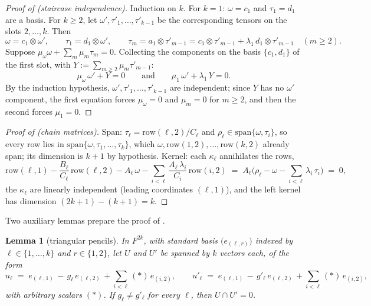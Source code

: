 \documentclass{article}
\newtheorem{lemma}[theorem]{Lemma}
\theoremstyle{definition}
\begin{document}
\begin{proof}[Proof of  (staircase independence)]
Induction on $k$. For $k = 1$: $\omega = c_1$ and $\tau_1 = d_1$ are a basis. For $k \geq 2$, let $\omega', \tau'_1, \dots, \tau'_{k-1}$ be the corresponding tensors on the slots $2, \dots, k$. Then
\[
\omega = c_1 \otimes \omega', \qquad \tau_1 = d_1 \otimes \omega', \qquad \tau_m = a_1 \otimes \tau'_{m-1} = c_1 \otimes \tau'_{m-1} + \lambda_1\, d_1 \otimes \tau'_{m-1} \quad (m \geq 2) .
\]
Suppose $\mu_\omega \omega + \sum_m \mu_m \tau_m = 0$. Collecting the components on the basis $\{c_1, d_1\}$ of the first slot, with $Y := \sum_{m \geq 2} \mu_m \tau'_{m-1}$:
\[
\mu_\omega\, \omega' + Y = 0 \qquad \text{and} \qquad \mu_1\, \omega' + \lambda_1\, Y = 0 .
\]
By the induction hypothesis, $\omega', \tau'_1, \dots, \tau'_{k-1}$ are independent; since $Y$ has no $\omega'$ component, the first equation forces $\mu_\omega = 0$ and $\mu_m = 0$ for $m \geq 2$, and then the second forces $\mu_1 = 0$.
\end{proof}

\begin{proof}[Proof of  (chain matrices)]
Span: $\tau_\ell = \mathrm{row}(\ell, 2)/C_\ell$ and $\rho_\ell \in \mathrm{span}\{\omega, \tau_i\}$, so every row lies in $\mathrm{span}\{\omega, \tau_1, \dots, \tau_k\}$, which $\omega, \mathrm{row}(1,2), \dots, \mathrm{row}(k,2)$ already span; its dimension is $k + 1$ by hypothesis. Kernel: each $\kappa_\ell$ annihilates the rows,
\[
\mathrm{row}(\ell,1) - \frac{B_\ell}{C_\ell}\, \mathrm{row}(\ell,2) - A_\ell\, \omega - \sum_{i<\ell} \frac{A_\ell\, \lambda_i}{C_i}\, \mathrm{row}(i,2) \;=\; A_\ell \Big( \rho_\ell - \omega - \sum_{i<\ell} \lambda_i\, \tau_i \Big) \;=\; 0 ,
\]
the $\kappa_\ell$ are linearly independent (leading coordinates $(\ell,1)$), and the left kernel has dimension $(2k+1) - (k+1) = k$.
\end{proof}

Two auxiliary lemmas prepare the proof of .

\begin{lemma}[triangular pencils]\label{lem:pencil}
In $F^{2k}$, with standard basis $\big(e_{(\ell, r)}\big)$ indexed by $\ell \in \{1, \dots, k\}$ and $r \in \{1, 2\}$, let $U$ and $U'$ be spanned by $k$ vectors each, of the form
\[
u_\ell \;=\; e_{(\ell,1)} \,-\, g_\ell\, e_{(\ell,2)} \,+ \sum_{i < \ell} (\ast)\, e_{(i,2)} , \qquad
u'_\ell \;=\; e_{(\ell,1)} \,-\, g'_\ell\, e_{(\ell,2)} \,+ \sum_{i < \ell} (\ast)\, e_{(i,2)} ,
\]
with arbitrary scalars $(\ast)$. If $g_\ell \neq g'_\ell$ for every $\ell$, then $U \cap U' = 0$.
\end{lemma}
\end{document}
